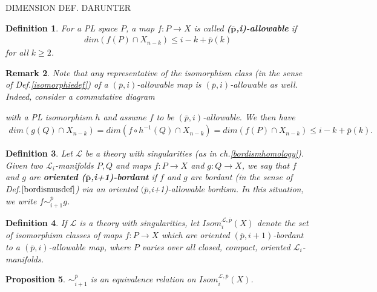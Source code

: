 \documentclass{scrreprt}
\newtheorem{prop}{Proposition}[chapter]
\newtheorem{definition}[prop]{Definition}
\newtheorem{remark}[prop]{Remark}
\begin{document}
DIMENSION DEF. DARUNTER
 
\begin{definition}
For a PL space $P$, a map $f: P \to X$ is called \textbf{($\boldsymbol{\overline{p}}$,i)-allowable} if 
\begin{align*}
dim(f(P) \cap X_{n-k}) \leq i-k+ \overline{p}(k)
\end{align*}
for all $k \geq 2$.
\end{definition}

\begin{remark}
Note that any representative of the isomorphism class (in the sense of Def.\ref{isomorphiedef}) of a $(\overline{p},i)$-allowable map is $(\overline{p},i)$-allowable as well. Indeed, consider a commutative diagram
\begin{xy}
\end{xy}
with a PL isomorphism $h$ and assume $f$ to be $(\overline{p},i)$-allowable. We then have
\begin{align*}
dim(g(Q) \cap X_{n-k}) = dim(f \circ h^{-1} (Q) \cap X_{n-k})=dim(f(P) \cap X_{n-k}) \leq i-k+ \overline{p}(k).
\end{align*}
\end{remark}

\begin{definition}
Let $\mathcal{L}$ be a theory with singularities (as in ch.\ref{bordismhomology}). Given two $\mathcal{L}_i$-manifolds $P,Q$ and maps $f: P \to X$ and $g: Q \to X$, we say that $f$ and $g$ are \textbf{oriented ($\boldsymbol{\overline{p}}$,i+1)-bordant} if $f$ and $g$ are bordant (in the sense of Def.$\ref{bordismusdef}$) via an oriented $({\overline{p}}$,i+1)-allowable bordism. In this situation, we write $f \sim_{i+1}^{\overline{p}} g$.
\end{definition}

\begin{definition}
If $\mathcal{L}$ is a theory with singularities, let $Isom_i^{\mathcal{L}, \overline{p}}(X)$ denote the set of isomorphism classes of maps $f: P \to X$ which are oriented $(\overline{p},i+1)$-bordant to a $(\overline{p},i)$-allowable map, where $P$ varies over all closed, compact, oriented $\mathcal{L}_i$- manifolds.
\end{definition}


\begin{prop}\label{intersectioneqrelation}
$\sim_{i+1}^{\overline{p}}$ is an equivalence relation on $Isom_i^{\mathcal{L}, \overline{p}}(X)$.
\end{prop}
\end{document}
